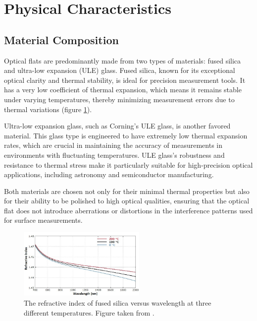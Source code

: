 \documentclass[../main.tex]{subfiles}
\begin{document}
\vspace{-10pt}

\section{Physical Characteristics}

\vspace{-15pt}

\subsection{Material Composition}

\vspace{-10pt}

Optical flats are predominantly made from two types of materials: fused silica and ultra-low expansion (ULE) glass. Fused silica, known for its exceptional optical clarity and thermal stability, is ideal for precision measurement tools. It has a very low coefficient of thermal expansion, which means it remains stable under varying temperatures, thereby minimizing measurement errors due to thermal variations (figure \ref{fig:refractive_index_silica}). \cite{Paschottafused_silica}

Ultra-low expansion glass, such as Corning's ULE glass, is another favored material. This glass type is engineered to have extremely low thermal expansion rates, which are crucial in maintaining the accuracy of measurements in environments with fluctuating temperatures. ULE glass's robustness and resistance to thermal stress make it particularly suitable for high-precision optical applications, including astronomy and semiconductor manufacturing. \cite{Corning_2022}

Both materials are chosen not only for their minimal thermal properties but also for their ability to be polished to high optical qualities, ensuring that the optical flat does not introduce aberrations or distortions in the interference patterns used for surface measurements. \cite{Corning_2022,Paschottafused_silica,doi:https://doi.org/10.1002/9780470135976.ch1}

\vspace{-12pt}


\begin{figure}[H]
    \centering
    \includegraphics[width=0.55\textwidth]{Images/Introduction/silica_refractive_index2}
    \vspace{-8pt}
    \caption{The refractive index of fused silica versus wavelength at three different temperatures. Figure taken from \cite{Paschottafused_silica}.}
    \label{fig:refractive_index_silica}
\end{figure}
\end{document}
